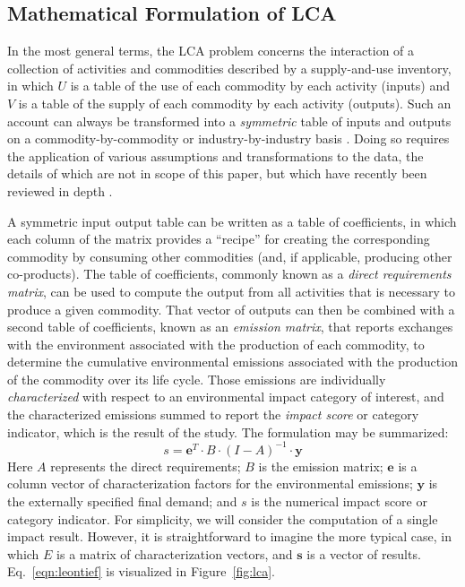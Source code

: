 \subsection{Mathematical Formulation of LCA}

In the most general terms, the LCA problem concerns the interaction of a collection of activities and commodities described by a supply-and-use inventory, in which $U$ is a table of the use of each commodity by each activity (inputs) and $V$ is a table of the supply of each commodity by each activity (outputs).  Such an account can always be transformed into a \textit{symmetric} table of inputs and outputs on a commodity-by-commodity or industry-by-industry basis \citep{Eurostat_2008}. Doing so requires the application of various assumptions and transformations to the data, the details of which are not in scope of this paper, but which have recently been reviewed in depth \citep{Suh_JIE_2010, Majeau_Bettez_2014}.  

A symmetric input output table can be written as a table of coefficients, in which each column of the matrix provides a ``recipe'' for creating the corresponding commodity by consuming other commodities (and, if applicable, producing other co-products).  The table of coefficients, commonly known as a \textit{direct requirements matrix}, can be used to compute the output from all activities that is necessary to produce a given commodity.  That vector of outputs can then be combined with a second table of coefficients, known as an \textit{emission matrix}, that reports exchanges with the environment associated with the production of each commodity, to determine the cumulative environmental emissions associated with the production of the commodity over its life cycle.  Those emissions are individually \textit{characterized} with respect to an environmental impact category of interest, and the characterized emissions summed to report the \textit{impact score} or category indicator, which is the result of the study.  The formulation may be summarized:
\begin{equation}
s = \mathbf{e}^T \cdot B \cdot \left(I - A\right)^{-1} \cdot \mathbf{y}
\label{eqn:leontief}
\end{equation}
Here $A$ represents the direct requirements; $B$ is the emission matrix;  $\mathbf{e}$ is a column vector of characterization factors for the environmental emissions; $\mathbf{y}$ is the externally specified final demand; and $s$ is the numerical impact score or category indicator.  For simplicity, we will consider the computation of a single impact result.  However, it is straightforward to imagine the more typical case, in which $E$ is a matrix of characterization vectors, and $\mathbf{s}$ is a vector of results.  Eq.~\ref{eqn:leontief} is visualized in Figure~\ref{fig:lca}.


